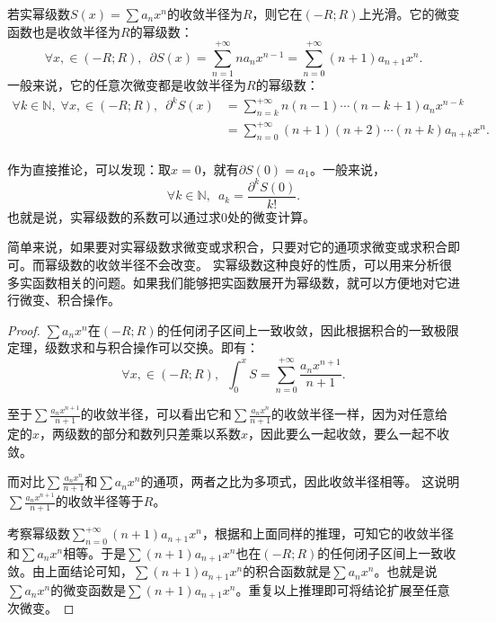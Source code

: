 \documentclass[12pt,UTF8]{ctexbook}
\begin{document}
\begin{appendix}
\begin{tm}\label{tm:c-4-30}
    若实幂级数$S(x) = \sum a_n x^n$的收敛半径为$R$，则它在$(-R;R)$上光滑。它的微变函数也是收敛半径为$R$的幂级数：
    $$ \forall x, \in (-R;R),\,\,\, \partial S(x) =  \sum_{n=1}^{+\infty} na_n x^{n-1} = \sum_{n=0}^{+\infty} (n + 1)a_{n+1} x^{n}. $$
    一般来说，它的任意次微变都是收敛半径为$R$的幂级数：
    \begin{align*}
        \forall k \in \mathbb{N},\;\forall x, \in (-R;R),\,\,\, \partial^k S(x) &= \sum_{n=k}^{+\infty} n(n-1)\cdots(n - k + 1)a_n x^{n-k} \\
        &= \sum_{n=0}^{+\infty} (n + 1)(n + 2)\cdots(n + k)a_{n+k} x^{n}. \\
    \end{align*}
\end{tm}

作为直接推论，可以发现：取$x=0$，就有$\partial S(0) = a_1$。一般来说，
$$\forall k\in \mathbb{N}, \,\,\, a_k = \frac{\partial^k S(0)}{k!}.$$
也就是说，实幂级数的系数可以通过求$0$处的微变计算。

简单来说，如果要对实幂级数求微变或求积合，只要对它的通项求微变或求积合即可。而幂级数的收敛半径不会改变。
实幂级数这种良好的性质，可以用来分析很多实函数相关的问题。如果我们能够把实函数展开为幂级数，就可以方便地对它进行微变、积合操作。

\begin{proof}
    $\sum a_n x^n$在$(-R;R)$的任何闭子区间上一致收敛，因此根据积合的一致极限定理，级数求和与积合操作可以交换。即有：
    $$ \forall x, \in (-R;R),\,\,\, \int_0^x S = \sum_{n=0}^{+\infty} \frac{a_n x^{n+1}}{n + 1}. $$
    
    至于$\sum \frac{a_n x^{n+1}}{n + 1}$的收敛半径，可以看出它和$\sum \frac{a_n x^{n}}{n + 1}$的收敛半径一样，因为对任意给定的$x$，两级数的部分和数列只差乘以系数$x$，因此要么一起收敛，要么一起不收敛。
    
    而对比$\sum \frac{a_n x^{n}}{n + 1}$和$\sum a_n x^n$的通项，两者之比为多项式，因此收敛半径相等。    这说明$\sum \frac{a_n x^{n+1}}{n + 1}$的收敛半径等于$R$。

    考察幂级数$\sum_{n=0}^{+\infty} (n + 1)a_{n+1} x^{n}$，根据和上面同样的推理，可知它的收敛半径和$\sum a_n x^n$相等。于是$\sum (n + 1)a_{n+1} x^{n}$也在$(-R;R)$的任何闭子区间上一致收敛。由上面结论可知，$\sum (n + 1)a_{n+1} x^{n}$的积合函数就是$\sum a_n x^n$。也就是说$\sum a_n x^n$的微变函数是$\sum (n + 1)a_{n+1} x^{n}$。重复以上推理即可将结论扩展至任意次微变。

\end{proof}



\end{appendix}
\end{document}
